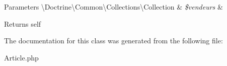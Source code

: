 \begin{DoxyParams}[1]{Parameters}
\textbackslash{}\+Doctrine\textbackslash{}\+Common\textbackslash{}\+Collections\textbackslash{}\+Collection & {\em \$vendeurs} & \\
\hline
\end{DoxyParams}
\begin{DoxyReturn}{Returns}
self 
\end{DoxyReturn}


The documentation for this class was generated from the following file\+:\begin{DoxyCompactItemize}
\item 
Article.\+php\end{DoxyCompactItemize}

